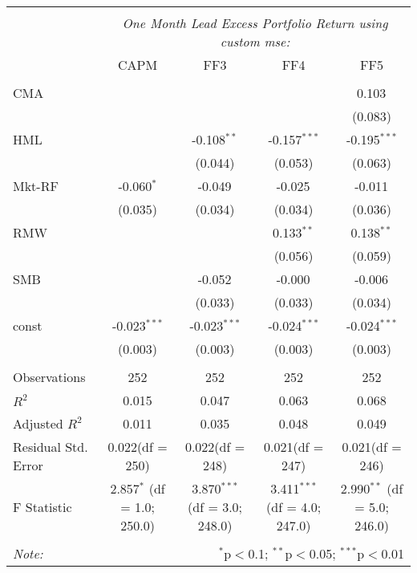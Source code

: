 \begin{table}[!htbp] \centering
\begin{tabular}{@{\extracolsep{5pt}}lcccc}
\\[-1.8ex]\hline
\hline \\[-1.8ex]
& \multicolumn{4}{c}{\textit{One Month Lead Excess Portfolio Return using custom mse:}} \
\cr \cline{4-5}
\\[-1.8ex] & CAPM & FF3 & FF4 & FF5 \\
\hline \\[-1.8ex]
 CMA & & & & 0.103$^{}$ \\
  & & & & (0.083) \\
 HML & & -0.108$^{**}$ & -0.157$^{***}$ & -0.195$^{***}$ \\
  & & (0.044) & (0.053) & (0.063) \\
 Mkt-RF & -0.060$^{*}$ & -0.049$^{}$ & -0.025$^{}$ & -0.011$^{}$ \\
  & (0.035) & (0.034) & (0.034) & (0.036) \\
 RMW & & & 0.133$^{**}$ & 0.138$^{**}$ \\
  & & & (0.056) & (0.059) \\
 SMB & & -0.052$^{}$ & -0.000$^{}$ & -0.006$^{}$ \\
  & & (0.033) & (0.033) & (0.034) \\
 const & -0.023$^{***}$ & -0.023$^{***}$ & -0.024$^{***}$ & -0.024$^{***}$ \\
  & (0.003) & (0.003) & (0.003) & (0.003) \\
\hline \\[-1.8ex]
 Observations & 252 & 252 & 252 & 252 \\
 $R^2$ & 0.015 & 0.047 & 0.063 & 0.068 \\
 Adjusted $R^2$ & 0.011 & 0.035 & 0.048 & 0.049 \\
 Residual Std. Error & 0.022(df = 250) & 0.022(df = 248) & 0.021(df = 247) & 0.021(df = 246)  \\
 F Statistic & 2.857$^{*}$ (df = 1.0; 250.0) & 3.870$^{***}$ (df = 3.0; 248.0) & 3.411$^{***}$ (df = 4.0; 247.0) & 2.990$^{**}$ (df = 5.0; 246.0) \\
\hline
\hline \\[-1.8ex]
\textit{Note:} & \multicolumn{4}{r}{$^{*}$p$<$0.1; $^{**}$p$<$0.05; $^{***}$p$<$0.01} \\
\end{tabular}
\end{table}
